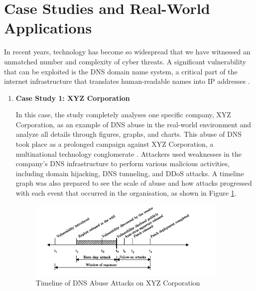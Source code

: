 \section{Case Studies and Real-World Applications}

In recent years, technology has become so widespread that we have witnessed an unmatched number and complexity of cyber threats. A significant vulnerability that can be exploited is the DNS domain name system, a critical part of the internet infrastructure that translates human-readable names into IP addresses \cite{kumari2021sac115}. 

\begin{enumerate} 
\item\textbf{ Case Study 1: XYZ Corporation }

In this case, the study completely analyses one specific company, XYZ Corporation, as an example of DNS abuse in the real-world environment and analyze all details through figures, graphs, and charts. This abuse of DNS took place as a prolonged campaign against XYZ Corporation, a multinational technology conglomerate \cite{mohammed2021network}. Attackers used weaknesses in the company's DNS infrastructure to perform various malicious activities, including domain hijacking, DNS tunneling, and DDoS attacks. A timeline graph was also prepared to see the scale of abuse and how attacks progressed with each event that occurred in the organisation, as shown in Figure \ref{fig:figureOne}.
\captionsetup{font= footnotesize}
\begin{figure}[ht!]
\centering
\includegraphics[width=0.9\textwidth]{background/XYZ1.png}
\caption{Timeline of DNS Abuse Attacks on XYZ Corporation}
\label{fig:figureOne}
\end{figure}


\end{enumerate}
